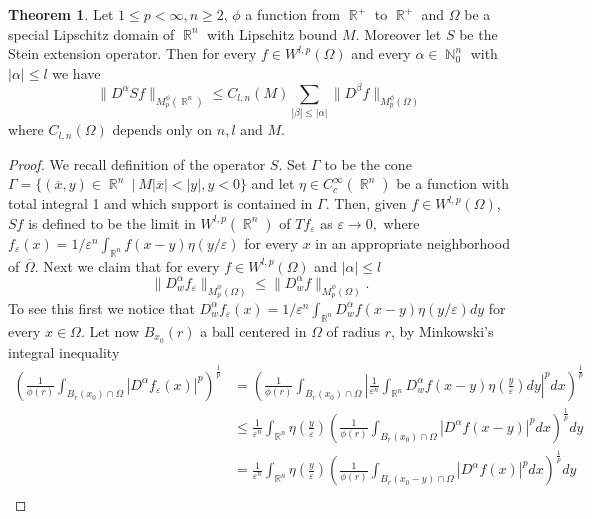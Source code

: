 \documentclass[12pt]{article}
\theoremstyle{definition}
\newtheorem{theorem}{Theorem}
\DeclareMathOperator\rr{\mathbb{R}}
\DeclareMathOperator\nn{\mathbb{N}}
\begin{document}
\begin{theorem}
Let $1\le p<\infty,n\ge2$, $\phi$ a function from $\rr^+$ to $\rr^+$ and $\Omega$ be a special Lipschitz domain of $\rr^n$ with Lipschitz bound $M.$ Moreover let $S$ be the Stein extension operator. Then for every $f \in W^{l,p}(\Omega)$ and every $\alpha \in \nn_0^n$ with $|\alpha|\le l$ we have
\begin{equation}
 \| D^\alpha Sf\|_{M_p^\phi(\rr^n)}\le C_{l,n}(M)\sum_{|\beta|\le |\alpha|}\|D^\beta f \|_{M_p^\phi(\Omega)} \label{Sbound}
 \end{equation}
 where $C_{l,n}(\Omega)$ depends only on $n,l$ and $M.$

 \begin{proof}
We recall definition of the operator $S.$ Set  $\Gamma$ to be the cone $\Gamma=\{(\overline x, y) \in \rr^n \ | \ M |\overline x|<|y|, y<0 \}$ and let $\eta \in C^\infty_c(\rr^n)$ be a function with total integral 1 and which support is contained in $\Gamma.$ Then, given $f \in W^{l,p}(\Omega)$, $Sf$ is defined to be the limit in $W^{l,p}(\rr^n)$ of $Tf_\varepsilon$ as $\varepsilon \to 0,$ where $f_\varepsilon(x)=1/\varepsilon^n \int_{\rr^n} f(x-y)\eta(y/\varepsilon)$ for every $x$ in an appropriate neighborhood of $	\overline \Omega$. Next we claim that for every $f \in W^{l,p}(\Omega)$ and $|\alpha|\le l$
\begin{equation}
\| D^\alpha_w f_\varepsilon\|_{M^\phi_p(\Omega)} \le \| D^\alpha_w f\|_{M^\phi_p(\Omega)} \label{epsbound}.
\end{equation}
To see this first we notice that $D^\alpha_w f_\varepsilon(x)=1/\varepsilon^n \int_{\rr^n} D^\alpha_w f(x-y)\eta(y/\varepsilon)dy$ for every $x \in \Omega.$ Let now $B_{x_0}(r)$ a ball centered in $\Omega$ of radius $r$, by Minkowski's integral inequality
\begin{align*}
 \left( \frac{1}{	\phi(r)} \int_{B_r(x_0)\cap \Omega} |D^\alpha f_\varepsilon (x)|^p \right)^{\frac{1}{p}} &= \left( \frac{1}{	\phi(r)} \int_{B_r(x_0)\cap \Omega} \left |\frac{1}{\varepsilon^n} \int_{\rr^n} D^\alpha_w f(x-y)\eta(\frac{y}{\varepsilon} )dy\right|^pdx \right)^{\frac{1}{p}} \\
 &\le \frac{1}{\varepsilon^n}  \int_{\rr^n} \eta(\frac{y}{\varepsilon} ) \left (\frac{1}{	\phi(r)}  \int_{B_r(x_0)\cap \Omega} |D^\alpha f(x-y)|^p dx\right)^{\frac{1}{p}}dy \\
 &=\frac{1}{\varepsilon^n}  \int_{\rr^n} \eta(\frac{y}{\varepsilon} ) \left (\frac{1}{	\phi(r)}  \int_{B_r(x_0-y)\cap \Omega} |D^\alpha f(x)|^p dx\right)^{\frac{1}{p}}dy \\

\end{align*}
\end{proof}
\end{theorem}
\end{document}
